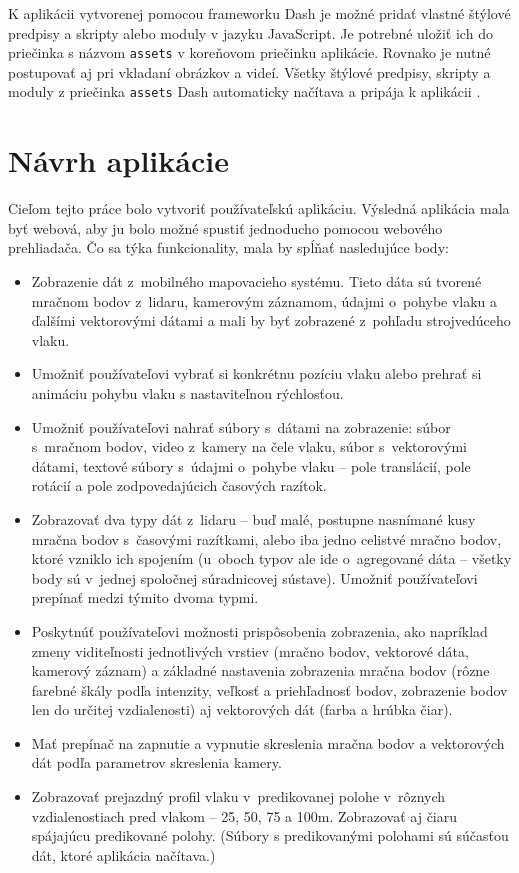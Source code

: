 K aplikácii vytvorenej pomocou frameworku Dash je možné pridať vlastné štýlové predpisy a skripty alebo moduly v jazyku JavaScript. Je potrebné uložiť ich do priečinka s názvom \texttt{assets} v koreňovom priečinku aplikácie. Rovnako je nutné postupovať aj pri vkladaní obrázkov a videí. Všetky štýlové predpisy, skripty a moduly z priečinka \texttt{assets} Dash automaticky načítava a pripája k aplikácii \cite{dash_documentation}.

\chapter{Návrh aplikácie}

Cieľom tejto práce bolo vytvoriť používateľskú aplikáciu. Výsledná aplikácia mala byť webová, aby ju bolo možné spustiť jednoducho pomocou webového prehliadača. Čo sa týka funkcionality, mala by spĺňať nasledujúce body:

\begin{itemize}
    \item Zobrazenie dát z~mobilného mapovacieho systému. Tieto dáta sú tvorené mračnom bodov z~lidaru, kamerovým záznamom, údajmi o~pohybe vlaku a ďalšími vektorovými dátami a mali by byť zobrazené z~pohľadu strojvedúceho vlaku.
    \item Umožniť používateľovi vybrať si konkrétnu pozíciu vlaku alebo prehrať si animáciu pohybu vlaku s nastaviteľnou rýchlosťou.
    \item Umožniť používateľovi nahrať súbory s~dátami na zobrazenie: súbor s~mračnom bodov, video z~kamery na čele vlaku, súbor s~vektorovými dátami, textové súbory s~údajmi o~pohybe vlaku -- pole translácií, pole rotácií a pole zodpovedajúcich časových razítok.
    \item Zobrazovať dva typy dát z~lidaru -- buď malé, postupne nasnímané kusy mračna bodov s~časovými razítkami, alebo iba jedno celistvé mračno bodov, ktoré vzniklo ich spojením (u~oboch typov ale ide o~agregované dáta -- všetky body sú v~jednej spoločnej súradnicovej sústave). Umožniť používateľovi prepínať medzi týmito dvoma typmi.
    \item Poskytnúť používateľovi možnosti prispôsobenia zobrazenia, ako napríklad zmeny viditeľnosti jednotlivých vrstiev (mračno bodov, vektorové dáta, kamerový záznam) a základné nastavenia zobrazenia mračna bodov (rôzne farebné škály podľa intenzity, veľkosť a priehľadnosť bodov, zobrazenie bodov len do určitej vzdialenosti) aj vektorových dát (farba a hrúbka čiar).
    \item Mať prepínač na zapnutie a vypnutie skreslenia mračna bodov a vektorových dát podľa parametrov skreslenia kamery.
    \item Zobrazovať prejazdný profil vlaku v~predikovanej polohe v~rôznych vzdialenostiach pred vlakom -- 25, 50, 75 a 100m. Zobrazovať aj čiaru spájajúcu predikované polohy. (Súbory s predikovanými polohami sú súčasťou dát, ktoré aplikácia načítava.)

\end{itemize}

